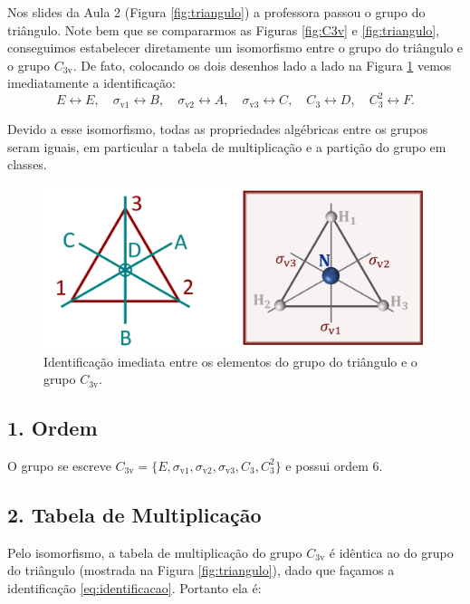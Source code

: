 \documentclass[a4paper,10pt]{article}
\begin{document}
Nos slides da Aula 2 (Figura \ref{fig:triangulo}) a professora passou o grupo do triângulo. Note bem que se compararmos as Figuras \ref{fig:C3v} e \ref{fig:triangulo}, conseguimos estabelecer diretamente um isomorfismo entre o grupo do triângulo e o grupo $C_{3\text{v}}$. De fato, colocando os dois desenhos lado a lado na Figura \ref{fig:comp} vemos imediatamente a identificação:
\begin{equation} \label{eq:identificacao}
E \leftrightarrow E, \quad
\sigma_{\text{v}1} \leftrightarrow B, \quad
\sigma_{\text{v}2} \leftrightarrow A, \quad
\sigma_{\text{v}3} \leftrightarrow C, \quad
C_3 \leftrightarrow D, \quad
C_3^2 \leftrightarrow F.
\end{equation}

Devido a esse isomorfismo, todas as propriedades algébricas entre os grupos seram iguais, em particular a tabela de multiplicação e a partição do grupo em classes.

\begin{figure}[H]
\centering
\includegraphics[width=0.6\linewidth]{fig/comp.png}
\caption{Identificação imediata entre os elementos do grupo do triângulo e o grupo $C_{3\text{v}}$.}
\label{fig:comp}
\end{figure}


\subsection*{1. Ordem}

O grupo se escreve $C_{3\text{v}} = \{E, \sigma_{\text{v}1}, \sigma_{\text{v}2}, \sigma_{\text{v}3}, C_3, C_3^2\}$ e possui ordem $6$.

\subsection*{2. Tabela de Multiplicação}

Pelo isomorfismo, a tabela de multiplicação do grupo $C_{3\text{v}}$ é idêntica ao do grupo do triângulo (mostrada na Figura \ref{fig:triangulo}), dado que façamos a identificação \ref{eq:identificacao}. Portanto ela é:
\end{document}
